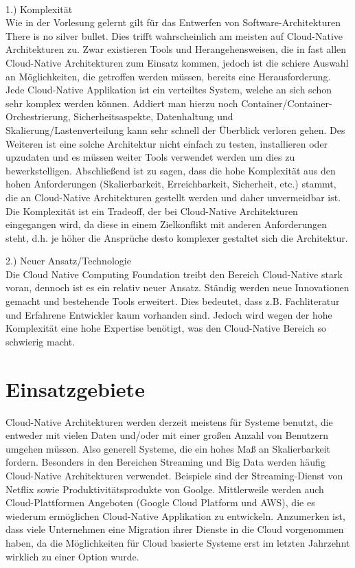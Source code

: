 \\
1.) Komplexität\\
Wie in der Vorlesung gelernt gilt für das Entwerfen von Software-Architekturen \glqq There is no silver bullet\grqq{}. Dies trifft wahrscheinlich am meisten auf Cloud-Native Architekturen zu. Zwar existieren Tools und Herangehensweisen, die in fast allen Cloud-Native Architekturen zum Einsatz kommen, jedoch ist die schiere Auswahl an Möglichkeiten, die getroffen werden müssen, bereits eine Herausforderung. 
Jede Cloud-Native Applikation ist ein verteiltes System, welche an sich schon sehr komplex werden können. Addiert man hierzu noch Container/Container-Orchestrierung, Sicherheitsaspekte, Datenhaltung und Skalierung/Lastenverteilung kann sehr schnell der Überblick verloren gehen. Des Weiteren ist eine solche Architektur nicht einfach zu testen, installieren oder upzudaten und es müssen weiter Tools verwendet werden um dies zu bewerkstelligen.
Abschließend ist zu sagen, dass die hohe Komplexität aus den hohen Anforderungen (Skalierbarkeit, Erreichbarkeit, Sicherheit, etc.) stammt, die an Cloud-Native Architekturen gestellt werden und daher unvermeidbar ist. Die Komplexität ist ein Tradeoff, der bei Cloud-Native Architekturen eingegangen wird, da diese in einem Zielkonflikt mit anderen Anforderungen steht, d.h. je höher die Ansprüche desto komplexer gestaltet sich die Architektur.


2.) Neuer Ansatz/Technologie\\
Die Cloud Native Computing Foundation treibt den Bereich Cloud-Native stark voran, dennoch ist es ein relativ neuer Ansatz. Ständig werden neue Innovationen gemacht und bestehende Tools erweitert. Dies bedeutet, dass z.B. Fachliteratur und Erfahrene Entwickler kaum vorhanden sind. Jedoch wird wegen der hohe Komplexität eine hohe Expertise benötigt, was den Cloud-Native Bereich so schwierig macht.

\section{Einsatzgebiete}
Cloud-Native Architekturen werden derzeit meistens für Systeme benutzt, die entweder mit vielen Daten und/oder mit einer großen Anzahl von Benutzern umgehen müssen. Also generell Systeme, die ein hohes Maß an Skalierbarkeit fordern. Besonders in den Bereichen Streaming und Big Data werden häufig Cloud-Native Architekturen verwendet. 
Beispiele sind der Streaming-Dienst von Netflix sowie Produktivitätsprodukte von Goolge. Mittlerweile werden auch Cloud-Plattformen Angeboten (Google Cloud Platform und AWS), die es wiederum ermöglichen Cloud-Native Applikation zu entwickeln.
Anzumerken ist, dass viele Unternehmen eine Migration ihrer Dienste in die Cloud vorgenommen haben, da die Möglichkeiten für Cloud basierte Systeme erst im letzten Jahrzehnt wirklich zu einer Option wurde.